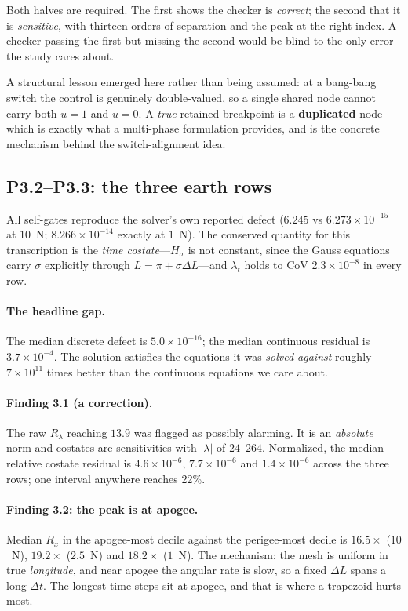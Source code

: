 \documentclass[11pt]{article}
\begin{document}
Both halves are required. The first shows the checker is \emph{correct}; the
second that it is \emph{sensitive}, with thirteen orders of separation and the
peak at the right index. A checker passing the first but missing the second
would be blind to the only error the study cares about.

A structural lesson emerged here rather than being assumed: at a bang-bang
switch the control is genuinely double-valued, so a single shared node cannot
carry both $u=1$ and $u=0$. A \emph{true} retained breakpoint is a
\textbf{duplicated} node---which is exactly what a multi-phase formulation
provides, and is the concrete mechanism behind the switch-alignment idea.

\subsection{P3.2--P3.3: the three earth rows}

All self-gates reproduce the solver's own reported defect
($6.245$ vs $6.273\times10^{-15}$ at $10$~N; $8.266\times10^{-14}$ exactly at
$1$~N). The conserved quantity for this transcription is the \emph{time
costate}---$H_\sigma$ is not constant, since the Gauss equations carry $\sigma$
explicitly through $L = \pi + \sigma\Delta L$---and $\lambda_t$ holds to
CoV $2.3\times10^{-8}$ in every row.

\paragraph{The headline gap.} The median discrete defect is
$5.0\times10^{-16}$; the median continuous residual is $3.7\times10^{-4}$. The
solution satisfies the equations it was \emph{solved against} roughly
$7\times10^{11}$ times better than the continuous equations we care about.

\paragraph{Finding 3.1 (a correction).} The raw $R_\lambda$ reaching $13.9$ was
flagged as possibly alarming. It is an \emph{absolute} norm and costates are
sensitivities with $|\lambda|$ of $24$--$264$. Normalized, the median relative
costate residual is $4.6\times10^{-6}$, $7.7\times10^{-6}$ and
$1.4\times10^{-6}$ across the three rows; one interval anywhere reaches 22\%.

\paragraph{Finding 3.2: the peak is at apogee.} Median $R_x$ in the
apogee-most decile against the perigee-most decile is $16.5\times$ ($10$~N),
$19.2\times$ ($2.5$~N) and $18.2\times$ ($1$~N). The mechanism: the mesh is
uniform in true \emph{longitude}, and near apogee the angular rate is slow, so
a fixed $\Delta L$ spans a long $\Delta t$. The longest time-steps sit at
apogee, and that is where a trapezoid hurts most.
\end{document}
